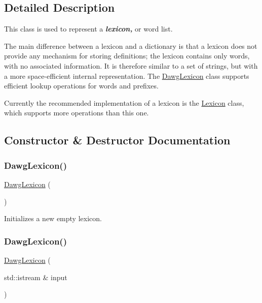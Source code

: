 \subsection{Detailed Description}
This class is used to represent a {\bfseries {\itshape lexicon,}} or word list. 

The main difference between a lexicon and a dictionary is that a lexicon does not provide any mechanism for storing definitions; the lexicon contains only words, with no associated information. It is therefore similar to a set of strings, but with a more space-\/efficient internal representation. The {\ttfamily \mbox{\hyperlink{classDawgLexicon}{Dawg\+Lexicon}}} class supports efficient lookup operations for words and prefixes.

Currently the recommended implementation of a lexicon is the {\ttfamily \mbox{\hyperlink{classLexicon}{Lexicon}}} class, which supports more operations than this one. 

\subsection{Constructor \& Destructor Documentation}
\mbox{\label{classDawgLexicon_ad974b1304fbda26ca2e7b0775640e826}} 
\subsubsection{\texorpdfstring{Dawg\+Lexicon()}{DawgLexicon()}\hspace{0.1cm}{\footnotesize\ttfamily [1/5]}}
{\footnotesize\ttfamily \mbox{\hyperlink{classDawgLexicon}{Dawg\+Lexicon}} (\begin{DoxyParamCaption}{ }\end{DoxyParamCaption})}



Initializes a new empty lexicon. 

\mbox{\label{classDawgLexicon_ad85bfb9847f7e7e33b68287b6ec800fd}} 
\subsubsection{\texorpdfstring{Dawg\+Lexicon()}{DawgLexicon()}\hspace{0.1cm}{\footnotesize\ttfamily [2/5]}}
{\footnotesize\ttfamily \mbox{\hyperlink{classDawgLexicon}{Dawg\+Lexicon}} (\begin{DoxyParamCaption}\item[{std\+::istream \&}]{input }\end{DoxyParamCaption})}



